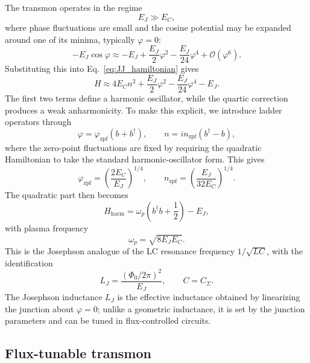 The transmon operates in the regime
\begin{equation}
    E_J \gg E_C,
\end{equation}
where phase fluctuations are small and the cosine potential may be expanded around one of its minima, typically $\varphi = 0$:
\begin{equation}
    -E_J \cos \varphi
    \approx
    -E_J
    + \frac{E_J}{2}\varphi^2
    - \frac{E_J}{24}\varphi^4
    + \mathcal{O}(\varphi^6).
\end{equation}
Substituting this into Eq.~\eqref{eq:JJ_hamiltonian} gives
\begin{equation}
    H
    \approx
    4E_C n^2
    +
    \frac{E_J}{2}\varphi^2
    -
    \frac{E_J}{24}\varphi^4
    -
    E_J.
\end{equation}
The first two terms define a harmonic oscillator, while the quartic correction produces a weak anharmonicity. To make this explicit, we introduce ladder operators through
\begin{equation}
    \varphi = \varphi_{\mathrm{zpf}}(b+b^\dagger),
    \qquad
    n = i n_{\mathrm{zpf}}(b^\dagger-b),
\end{equation}
where the zero-point fluctuations are fixed by requiring the quadratic Hamiltonian to take the standard harmonic-oscillator form. This gives
\begin{equation}
    \varphi_{\mathrm{zpf}} = \left(\frac{2E_C}{E_J}\right)^{1/4},
    \qquad
    n_{\mathrm{zpf}} = \left(\frac{E_J}{32E_C}\right)^{1/4}.
\end{equation}
The quadratic part then becomes
\begin{equation}
    H_{\mathrm{harm}}
    =
    \omega_p
    \left(
        b^\dagger b + \frac{1}{2}
    \right)
    -
    E_J,
\end{equation}
with plasma frequency
\begin{equation}
    \omega_p = \sqrt{8E_JE_C}.
\end{equation}
This is the Josephson analogue of the LC resonance frequency $1/\sqrt{LC}$, with the identification
\begin{equation}
    L_J = \frac{(\Phi_0/2\pi)^2}{E_J},
    \qquad
    C = C_\Sigma.
\end{equation}
The Josephson inductance $L_J$ is the effective inductance obtained by linearizing the junction about $\varphi=0$; unlike a geometric inductance, it is set by the junction parameters and can be tuned in flux-controlled circuits.
\subsection{Flux-tunable transmon}

